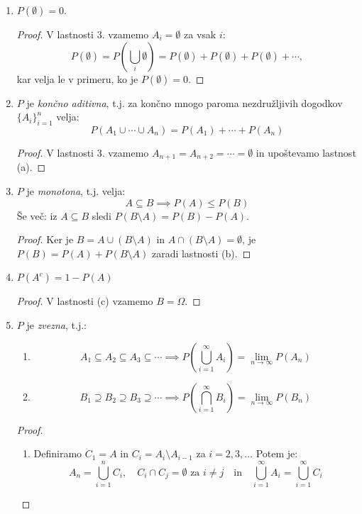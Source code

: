 \documentclass[12pt]{book}
\theoremstyle{definition}
\theoremstyle{plain}
\theoremstyle{plain}
\theoremstyle{plain}
\theoremstyle{remark}
\begin{document}
\begin{enumerate}[label=(\alph*)]
    \item $P(\emptyset) = 0$. 
    \begin{proof}
        V lastnosti 3. vzamemo $A_i = \emptyset$ za vsak $i$: 
        $$
        P(\emptyset) = P\left(\bigcup_i \emptyset\right)=P(\emptyset)+P(\emptyset)+P(\emptyset)+\cdots,
        $$
        kar velja le v primeru, ko je $P(\emptyset) = 0$.
    \end{proof}
    \item $P$ je \emph{končno aditivna}, t.j. za končno mnogo paroma nezdružljivih dogodkov $\{A_i\}_{i=1}^{n}$ velja: 
    $$
    P\left(A_1 \cup \cdots \cup A_n\right)=P\left(A_1\right)+\cdots+P\left(A_n\right)
    $$
    \begin{proof}
        V lastnosti 3. vzamemo $A_{n+1}=A_{n+2}=\cdots=\emptyset$ in upoštevamo lastnost (a). 
    \end{proof}
    \item $P$ je \emph{monotona}, t.j. velja: 
    $$
    A \subseteq B \implies P(A) \leq P(B)
    $$ 
    Še več: iz $A \subseteq B$  sledi $P(B \setminus A)=P(B)-P(A)$.
    \begin{proof}
        Ker je $B=A \cup(B \setminus A)$ in $A \cap(B \setminus A)=\emptyset$, je $P(B)=P(A)+P(B \setminus A)$ zaradi lastnosti (b).
    \end{proof}
    \item $P(A^c) = 1-P(A)$
    \begin{proof}
        V lastnosti (c) vzamemo $B = \Omega$.
    \end{proof}
    \item $P$ je \emph{zvezna}, t.j.:
    
    \begin{enumerate}[label=(\roman*)]
        \item $$ A_1 \subseteq A_2 \subseteq A_3 \subseteq \cdots \implies P\left(\bigcup_{i=1}^{\infty} A_i\right)=\lim _{n \to \infty} P\left(A_n\right)$$
        \item $$ B_1 \supseteq B_2 \supseteq B_3 \supseteq \cdots \implies P\left(\bigcap_{i=1}^{\infty} B_i\right)=\lim _{n \to \infty} P\left(B_n\right)$$
    \end{enumerate}

    \begin{proof} 
        ~

        \begin{enumerate}[label=(\roman*)]
            \item Definiramo $C_1 = A$ in $C_i = A_i \setminus A_{i-1}$ za $i = 2, 3, \ldots$ Potem je:
            $$
            A_n=\bigcup_{i=1}^n C_i, \quad C_i \cap C_j=\emptyset \text{ za } i \neq j \quad \text{in} \quad \bigcup_{i=1}^{\infty} A_i=\bigcup_{i=1}^{\infty} C_i
            $$ 
            

\end{enumerate}
\end{proof}
\end{enumerate}
\end{document}
